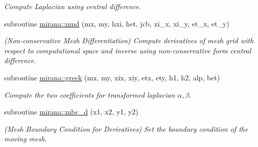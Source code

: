 \begin{DoxyCompactItemize}
\begin{DoxyCompactList}\small\item\em Compute Laplacian using central difference. \end{DoxyCompactList}\item 
subroutine \hyperlink{namespacemirana_a53c223d4530275ef3fc6a5820f5b0990}{mirana\+::nmd} (mx, my, hxi, het, jcb, xi\+\_\+x, xi\+\_\+y, et\+\_\+x, et\+\_\+y)
\begin{DoxyCompactList}\small\item\em (Non-\/conservative Mesh Differentiation) Compute derivatives of mesh grid with respect to computational space and inverse using non-\/conservative form central difference. \end{DoxyCompactList}\item 
subroutine \hyperlink{namespacemirana_a7530ea2e7b2dfe85f3a088d24de59f1d}{mirana\+::greek} (mx, my, xix, xiy, etx, ety, h1, h2, alp, bet)
\begin{DoxyCompactList}\small\item\em Compute the two coefficients for transformed laplacian $\alpha,\beta$. \end{DoxyCompactList}\item 
subroutine \hyperlink{namespacemirana_a65a514d206d0e8ae53253938d2aff553}{mirana\+::mbc\+\_\+d} (x1, x2, y1, y2)
\begin{DoxyCompactList}\small\item\em (Mesh Boundary Condition for Derivatives) Set the boundary condition of the moving mesh. \end{DoxyCompactList}\end{DoxyCompactItemize}
